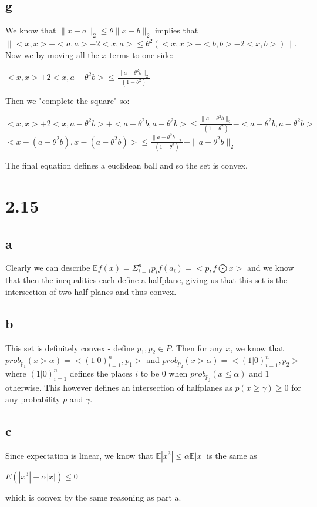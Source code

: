 \documentclass{article}
\begin{document}
\subsection*{g}
We know that $\|x-a\|_2 \leq \theta\|x-b\|_2$ implies that $\|<x,x> + <a,a> - 2<x,a> \leq \theta^2(<x,x> + <b,b> - 2<x,b>)\|$.  Now we by moving all the $x$ terms to one side:
\begin{center}
    $<x,x> + 2<x,a- \theta^2 b> \leq \frac{\|a-\theta^2 b\|_2}{(1-\theta^2)}$
\end{center}
Then we "complete the square" so:
\begin{center}
    $<x,x> + 2<x,a- \theta^2 b> + <a- \theta^2 b,a- \theta^2 b> \leq \frac{\|a-\theta^2 b\|_2}{(1-\theta^2)} - <a- \theta^2 b,a- \theta^2 b>$
    $<x - (a- \theta^2 b),x - (a- \theta^2 b)> \leq \frac{\|a-\theta^2 b\|_2}{(1-\theta^2)} - \|a - \theta^2 b\|_2$
\end{center}
The final equation defines a euclidean ball and so the set is convex.
\section*{2.15}
\subsection*{a}
Clearly we can describe $\mathbb{E} f(x) = \Sigma_{i=1}^{n}p_i f(a_i) = <p, f \bigodot x>$ and we know that then the inequalities each define a halfplane, giving us that this set is the intersection of two half-planes and thus convex.
\subsection*{b}
This set is definitely convex - define $p_1, p_2 \in P$.  Then for any $x$, we know that $prob_{p_1}(x > \alpha) = <(1|0)_{i=1}^{n}, p_1>$ and $prob_{p_2}(x > \alpha) = <(1|0)_{i=1}^{n}, p_2>$  where $(1|0)_{i=1}^{n}$ defines the places $i$ to be $0$ when $prob_{p_j}(x \leq \alpha)$ and $1$ otherwise.  This however defines an intersection of halfplanes as $p(x \geq \gamma) \geq 0$ for any probability $p$ and $\gamma$.
\subsection*{c}
Since expectation is linear, we know that $\mathbb{E} |x^3| \leq \alpha \mathbb{E} |x|$ is the same as 
\begin{center}$E(|x^3| - \alpha |x|)\leq 0$\end{center} which is convex by the same reasoning as part a.
\end{document}
